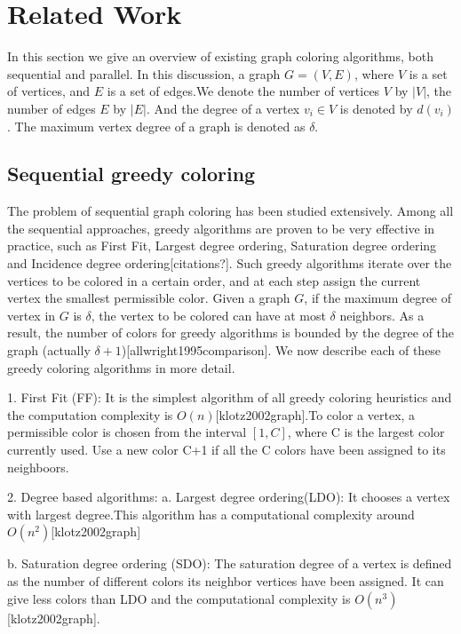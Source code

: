 \documentclass[preprint]{sigplanconf}
\begin{document}
\section{ Related Work}
In this section we give an overview of existing graph coloring algorithms, both sequential and parallel.  In this discussion, a graph $G=(V,E)$, where $V$ is a set of vertices, and $E$ is a set of edges.We denote the number of vertices $V$ by $|V|$, the number of edges $E$ by $|E|$. And the degree of a vertex $v_i \in V$ is denoted by $d(v_i)$. The maximum vertex degree of a graph is denoted as $\delta$.

\subsection{Sequential greedy coloring}

The problem of sequential graph coloring has been studied extensively. Among all the sequential approaches, greedy algorithms are proven to be very effective in practice, such as First Fit, Largest degree ordering, Saturation degree ordering and Incidence degree ordering[citations?]. Such greedy algorithms iterate over the vertices to be colored in a certain order, and at each step assign the current vertex the smallest permissible color. Given a graph $G$, if the maximum degree of vertex in $G$ is $\delta$, the vertex to be colored can have at most $\delta$ neighbors. As a result, the number of colors for greedy algorithms is bounded by the degree of the graph (actually $\delta+1$)[allwright1995comparison].  We now describe each of these greedy coloring algorithms in more detail.

1. First Fit (FF): It is the simplest algorithm of all greedy coloring heuristics and the computation complexity is $O(n)$[klotz2002graph].To color a vertex, a permissible color is chosen from the interval $[1,C]$, where C is the largest color currently used. Use a new color C+1 if all the C colors have been assigned to its neighboors.

2. Degree based algorithms:
a. Largest degree ordering(LDO):  It chooses a  vertex with largest degree.This algorithm has a computational complexity around $O(n^2)$[klotz2002graph]

b. Saturation degree ordering (SDO): The saturation degree of a vertex is defined  as the number of different colors its neighbor vertices have been assigned. It can give less colors than LDO and the computational complexity is $O(n^3)$[klotz2002graph].
\end{document}

